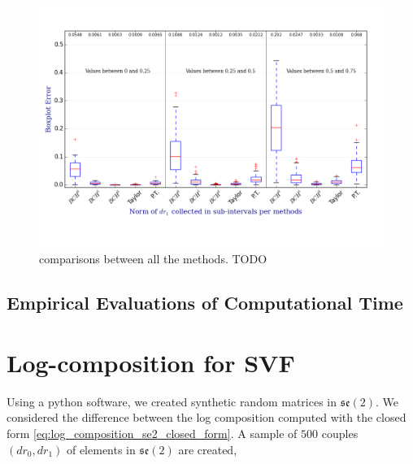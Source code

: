 \begin{figure}[!ht]
	\hspace{-2cm}
	\includegraphics[scale=0.75]{figures/se2_boxplot.png}
	\caption{comparisons between all the methods. TODO}
	\label{fig:se2_boxplot}
\end{figure}


\subsection{Empirical Evaluations of Computational Time}


\section{Log-composition for SVF}
Using a python software, we created synthetic random matrices in $\mathfrak{se}(2)$. We considered the difference between the log composition computed with the closed form \ref{eq:log_composition_se2_closed_form}. 
A sample of $500$ couples $(dr_0,dr_1)$ of elements in $\mathfrak{se}(2)$ are created, 



